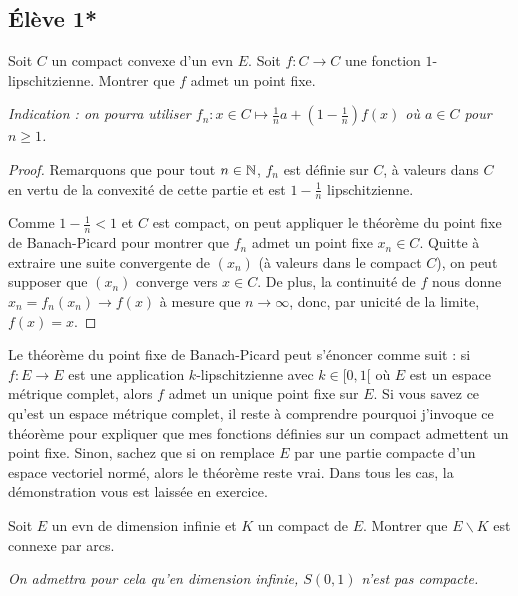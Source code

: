 \documentclass[10pt]{scrartcl}
\title{}
\author{}
\date{}
\begin{document}
    \subsection*{Élève 1*}
    \begin{exo}
        Soit $C$ un compact convexe d'un evn $E$. 
        Soit $f:C\to C$ une fonction $1$-lipschitzienne. 
        Montrer que $f$ admet un point fixe. 

        \textit{Indication : on pourra utiliser $f_n:x\in C\mapsto \frac1na+\left(1-\frac1n\right)f(x)$ où $a\in C$ pour $n\geq 1$.}
    \end{exo}

    \begin{proof}
        Remarquons que pour tout $n\in\operatorname{\mathbb N}$, $f_n$ est définie sur $C$, à valeurs dans $C$ en vertu de la convexité de cette partie et est $1-\frac1n$ lipschitzienne. 
        
        Comme $1-\frac1n<1$ et $C$ est compact, on peut appliquer le théorème du point fixe de Banach-Picard pour montrer que $f_n$ admet un point fixe $x_n\in C$. 
        Quitte à extraire une suite convergente de $(x_n)$ (à valeurs dans le compact $C$), on peut supposer que $(x_n)$ converge vers $x\in C$. 
        De plus, la continuité de $f$ nous donne $x_n=f_n(x_n)\to f(x)$ à mesure que $n\to\infty$, donc, par unicité de la limite, $f(x)=x$.
    \end{proof}

    \begin{remarks}
        Le théorème du point fixe de Banach-Picard peut s'énoncer comme suit : si $f:E\to E$ est une application $k$-lipschitzienne avec $k\in[0,1[$ où $E$ est un espace métrique complet, alors $f$ admet un unique point fixe sur $E$.
        Si vous savez ce qu'est un espace métrique complet, il reste à comprendre pourquoi j'invoque ce théorème pour expliquer que mes fonctions définies sur un compact admettent un point fixe.
        Sinon, sachez que si on remplace $E$ par une partie compacte d'un espace vectoriel normé, alors le théorème reste vrai. Dans tous les cas, la démonstration vous est laissée en exercice.
    \end{remarks}
    
    \begin{exo}
        Soit $E$ un evn de dimension infinie et $K$ un compact de $E$. 
        Montrer que $E\backslash K$ est connexe par arcs.

        \textit{On admettra pour cela qu'en dimension infinie, $S(0,1)$ n'est pas compacte.}
    \end{exo}
\end{document}
